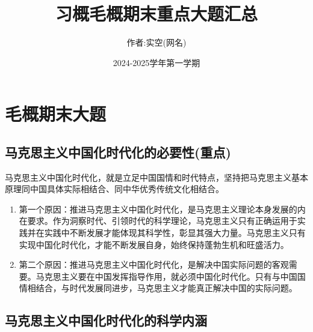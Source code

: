 \documentclass[12pt, a4paper, oneside]{ctexbook}
\title{{\Huge{\textbf{习概毛概期末重点大题汇总}}}}
\author{作者:实空(网名)}
\date{2024-2025学年第一学期}
\begin{document}
\maketitle

\setcounter{page}{1}




{}
\setcounter{page}{1}
\tableofcontents
\newpage
\setcounter{page}{1}

\chapter{毛概期末大题}

\section{马克思主义中国化时代化的必要性(重点)}

马克思主义中国化时代化，就是立足中国国情和时代特点，坚持把马克思主义基本原理同中国具体实际相结合、同中华优秀传统文化相结合。

\begin{enumerate}
\item 第一个原因：推进马克思主义中国化时代化，是马克思主义理论本身发展的内在要求。作为洞察时代、引领时代的科学理论，马克思主义只有正确运用于实践并在实践中不断发展才能体现其科学性，彰显其强大力量。马克思主义只有实现中国化时代化，才能不断发展自身，始终保持蓬勃生机和旺盛活力。
\item 第二个原因：推进马克思主义中国化时代化，是解决中国实际问题的客观需要。马克思主义要在中国发挥指导作用，就必须中国化时代化。只有与中国国情相结合，与时代发展同进步，马克思主义才能真正解决中国的实际问题。
\end{enumerate}

\section{马克思主义中国化时代化的科学内涵}
\end{document}
